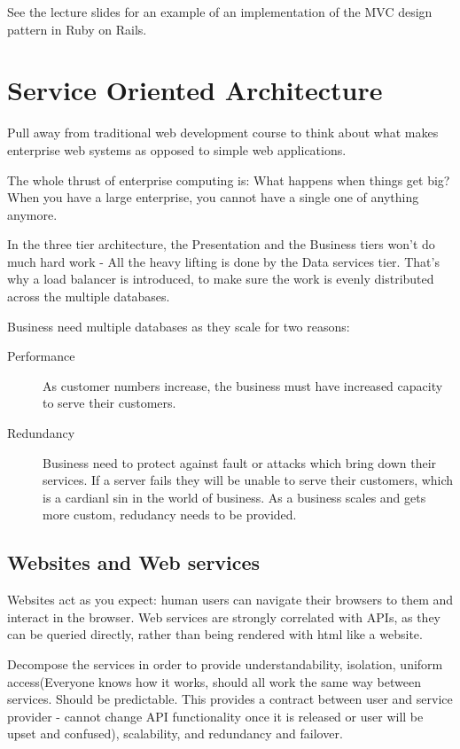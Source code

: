 \documentclass[11pt]{article}
\begin{document}
See the lecture slides for an example of an implementation of the MVC design pattern in Ruby on Rails.


\section{Service Oriented Architecture}
\label{sec:SOA}

Pull away from traditional web development course to think about what makes enterprise web systems as opposed to simple web applications.

The whole thrust of enterprise computing is: What happens when things get big? When you have a large enterprise, you cannot have a single one of anything anymore.

In the three tier architecture, the Presentation and the Business tiers won’t do much hard work - All the heavy lifting is done by the Data services tier. That’s why a load balancer is introduced, to make sure the work is evenly distributed across the multiple databases.

Business need multiple databases as they scale for two reasons:
\begin{description}
\item[Performance] As customer numbers increase, the business must have increased capacity to serve their customers.
\item[Redundancy] Business need to protect against fault or attacks which bring down their services. If a server fails they will be unable to serve their customers, which is a cardianl sin in the world of business. As a business scales and gets more custom, redudancy needs to be provided.
\end{description}

\subsection{Websites and Web services}

Websites act as you expect: human users can navigate their browsers to them and interact in the browser. Web services are strongly correlated with APIs, as they can be queried directly, rather than being rendered with html like a website. 

Decompose the services in order to provide understandability, isolation, uniform access(Everyone knows how it works, should all work the same way between services. Should be predictable. This provides a contract between user and service provider - cannot change API functionality once it is released or user will be upset and confused), scalability, and redundancy and failover.
\end{document}
